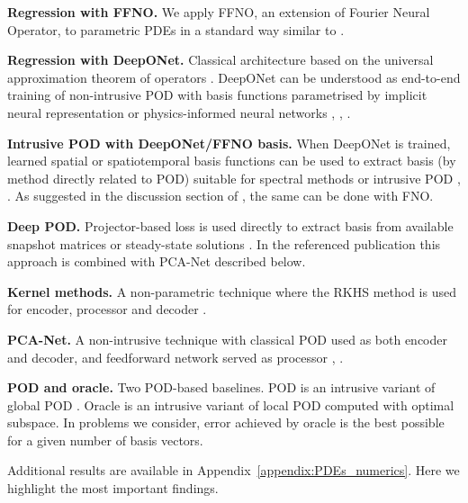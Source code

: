 \documentclass{article}
\begin{document}
\textbf{Regression with FFNO.} We apply FFNO, an extension of Fourier Neural Operator, to parametric PDEs in a standard way similar to \cite{tran2021factorized}.

\textbf{Regression with DeepONet.} Classical architecture based on the universal approximation theorem of operators \cite{lu2019deeponet}. DeepONet can be understood as end-to-end training of non-intrusive POD with basis functions parametrised by implicit neural representation or physics-informed neural networks \cite{sitzmann2020implicit}, \cite{lagaris1998artificial}, \cite{raissi2019physics}.

\textbf{Intrusive POD with DeepONet/FFNO basis.} When DeepONet is trained, learned spatial or spatiotemporal basis functions can be used to extract basis (by method directly related to POD) suitable for spectral methods or intrusive POD \cite{meuris2021machine}, \cite{meuris2023machine}. As suggested in the discussion section of \cite{meuris2021machine}, the same can be done with FNO.

\textbf{Deep POD.} Projector-based loss is used directly to extract basis from available snapshot matrices or steady-state solutions \cite{francodeep}. In the referenced publication this approach is combined with PCA-Net described below.

\textbf{Kernel methods.} A non-parametric technique where the RKHS method is used for encoder, processor and decoder \cite{batlle2024kernel}.

\textbf{PCA-Net.} A non-intrusive technique with classical POD used as both encoder and decoder, and feedforward network served as processor \cite{hesthaven2018non}, \cite{bhattacharya2021model}.

\textbf{POD and oracle.} Two POD-based baselines. POD is an intrusive variant of global POD \cite{volkwein2013proper}. Oracle is an intrusive variant of local POD computed with optimal subspace. In problems we consider, error achieved by oracle is the best possible for a given number of basis vectors.

Additional results are available in Appendix~\ref{appendix:PDEs_numerics}. Here we highlight the most important findings.
\end{document}
